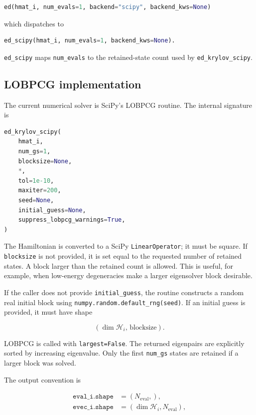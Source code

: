 \documentclass[11pt]{article}
\begin{document}
\begin{lstlisting}[language=Python]
ed(hmat_i, num_evals=1, backend="scipy", backend_kws=None)
\end{lstlisting}

which dispatches to

\begin{lstlisting}[language=Python]
ed_scipy(hmat_i, num_evals=1, backend_kws=None).
\end{lstlisting}

\texttt{ed\_scipy} maps \texttt{num\_evals} to the retained-state count used by \texttt{ed\_krylov\_scipy}.

\subsection{LOBPCG implementation}

The current numerical solver is SciPy's LOBPCG routine.  The internal signature is

\begin{lstlisting}[language=Python]
ed_krylov_scipy(
    hmat_i,
    num_gs=1,
    blocksize=None,
    *,
    tol=1e-10,
    maxiter=200,
    seed=None,
    initial_guess=None,
    suppress_lobpcg_warnings=True,
)
\end{lstlisting}

The Hamiltonian is converted to a SciPy \texttt{LinearOperator}; it must be square.  If \texttt{blocksize} is not provided, it is set equal to the requested number of retained states.  A block larger than the retained count is allowed.  This is useful, for example, when low-energy degeneracies make a larger eigensolver block desirable.

If the caller does not provide \texttt{initial\_guess}, the routine constructs a random real initial block using \texttt{numpy.random.default\_rng(seed)}.  If an initial guess is provided, it must have shape

\begin{equation}
  (\dim\mathcal H_i,\,\mathrm{blocksize}).
\end{equation}

LOBPCG is called with \texttt{largest=False}.  The returned eigenpairs are explicitly sorted by increasing eigenvalue.  Only the first \texttt{num\_gs} states are retained if a larger block was solved.

The output convention is

\begin{align}
  \texttt{eval\_i.shape} &= (N_{\mathrm{eval}},),\\
  \texttt{evec\_i.shape} &= (\dim\mathcal H_i,N_{\mathrm{eval}}),
\end{align}
\end{document}
